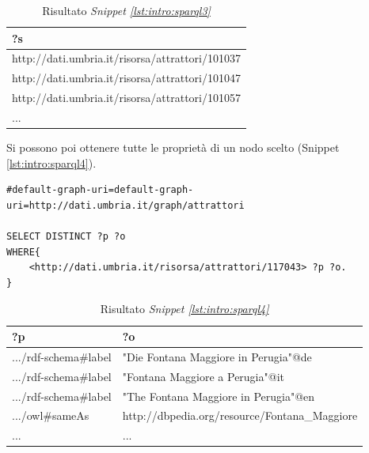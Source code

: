 \begin{table}[htbp]
\begin{center}
\begin{tabular}{|l|}
\hline \textbf{?s} \\
\hline
http://dati.umbria.it/risorsa/attrattori/101037\\
\hline
http://dati.umbria.it/risorsa/attrattori/101047\\
\hline
http://dati.umbria.it/risorsa/attrattori/101057\\
\hline
...\\
\hline
\end{tabular}
\end{center}
\caption{Risultato \textit{Snippet \ref{lst:intro:sparql3}}}
\label{tab:intro:sparql3}
\end{table}

Si possono poi ottenere tutte le proprietà di un nodo scelto (Snippet \ref{lst:intro:sparql4}).

\begin{lstlisting}[frame=single, caption={Ottenere i valori delle proprietà del nodo scelto},label={lst:intro:sparql4}]  
#default-graph-uri=default-graph-uri=http://dati.umbria.it/graph/attrattori

SELECT DISTINCT ?p ?o
WHERE{
    <http://dati.umbria.it/risorsa/attrattori/117043> ?p ?o.
}
\end{lstlisting}

\begin{table}[htbp]
\begin{center}
\begin{tabular}{|l|l|}
\hline \textbf{?p} & \textbf{?o} \\
\hline
.../rdf-schema\#label &	"Die Fontana Maggiore in Perugia"@de\\
\hline
.../rdf-schema\#label &	"Fontana Maggiore a Perugia"@it\\
\hline
.../rdf-schema\#label &	"The Fontana Maggiore in Perugia"@en\\
\hline
.../owl\#sameAs &	http://dbpedia.org/resource/Fontana\_Maggiore\\
\hline
...&...\\
\hline
\end{tabular}
\end{center}
\caption{Risultato \textit{Snippet \ref{lst:intro:sparql4}}}
\label{tab:intro:sparql4}
\end{table}

